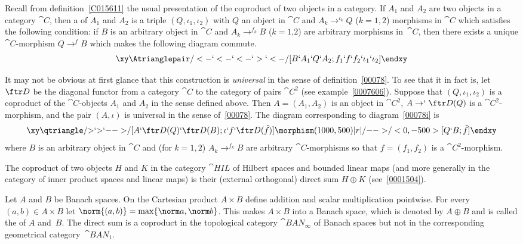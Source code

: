 \begin{exam} Recall from definition~\ref{C015611} the usual presentation of the coproduct of two objects in a category. If
$A_1$ and $A_2$ are two objects in a category $\cat C$, then a
 of $A_1$ and $A_2$ is a triple $(Q,\iota_1,\iota_2)$ with $Q$ an object in
$\cat C$ and $A_k \to^{\iota_k} Q$ ($k = 1,2$) morphisms in $\cat C$ which satisfies the
following condition: if $B$ is an arbitrary object in $\cat C$ and $A_k \to^{f_k} B$ ($k
= 1$,$2$) are arbitrary morphisms in~$\cat C$, then there exists a unique $\cat C$-morphism
$Q \to^f B$ which makes the following diagram commute.
  \begin{equation}
    \xy
      \Atrianglepair/<-`<-`<-`>`<-/[B`A_1`Q`A_2;f_1`f`f_2`\iota_1`\iota_2]
    \endxy
   \end{equation}

It may not be obvious at first glance that this construction is \emph{universal} in the
sense of definition~\ref{00078}.  To see that it in fact is, let $\ftr D$ be the diagonal
functor from a category $\cat C$ to the category of pairs $\cat{C^2}$ (see
example~\ref{0007606}). Suppose that $(Q,\iota_1,\iota_2)$ is a coproduct of the $\cat
C$-objects $A_1$ and $A_2$ in the sense defined above.  Then $A = (A_1,A_2)$ is an object
in $\cat{C^2}$, $A \to^{\iota} \ftr D(Q)$ is a $\cat{C^2}$-morphism, and the pair
$(A,\iota)$ is universal in the sense of~\ref{00078}.  The diagram corresponding to
diagram~\eqref{00078i} is
 \begin{equation}
   \xy
     \qtriangle/{>}`{>}`{-->}/[A`\ftr D(Q)`\ftr D(B);\iota`f`\ftr D(\tilde f)]
     \morphism(1000,500)|r|/{-->}/<0,-500>[Q`B;\tilde f]
   \endxy
 \end{equation}
where $B$ is an arbitrary object in $\cat C$ and (for $k = 1,2$) $A_k \to^{f_k} B$ are
arbitrary $\cat C$-morphisms so that $f = (f_1,f_2)$ is a $\cat{C^2}$-morphism.
\end{exam}

\begin{exam} The coproduct of two objects $H$ and $K$ in the category $\cat{HIL}$ of
Hilbert spaces and bounded linear maps (and more generally in the category of inner
product spaces and linear maps) is their (external orthogonal) direct sum $H \oplus K$
(see~\ref{0001504}).
\end{exam}


\begin{exam}\label{00078036} Let $A$ and $B$ be Banach spaces. On the Cartesian
product $A \times B$ define addition and scalar multiplication pointwise. For every
$(a,b) \in A \times B$ let $\norm{(a,b)} = \max\{\norm a,\norm b\}$. This makes $A \times
B$ into a Banach space, which is denoted by $A \oplus B$ and is called the
 of $A$ and~$B$.  The direct sum is a coproduct in the topological
category $\cat{BAN_\infty}$ of Banach spaces but not in the corresponding geometrical
category~$\cat{BAN_1}$.
\end{exam}

